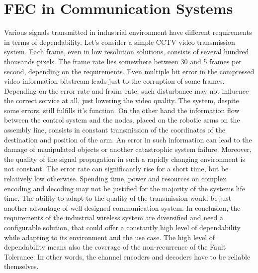\section{FEC in Communication Systems}
Various signals transmitted in industrial environment have different requirements in terms of dependability. Let's consider a simple CCTV video transmission system. Each frame, even in low resolution solutions, consists of several hundred thousands pixels. The frame rate lies somewhere between 30 and 5 frames per second, depending on the requirements. Even multiple bit error in the compressed video information bitstream leads just to the corruption of some frames. Depending on the error rate and frame rate, such disturbance may not influence the correct service at all, just lowering the video quality. The system, despite some errors, still fulfills it's function. 
On the other hand the information flow between the control system and the nodes, placed on the robotic arms on the assembly line, consists in constant transmission of the coordinates of the destination and position of the arm. An error in such information can lead to the damage of manipulated objects or another catastrophic system failure.
Moreover, the quality of the signal propagation in such a rapidly changing environment is not constant. The error rate can significantly rise for a short time, but be relatively low otherwise. Spending time, power and resources on complex encoding and decoding may not be justified for the majority of the systems life time. The ability to adapt to the quality of the transmission would be just another advantage of well designed communication system.
In conclusion, the requirements of the industrial wireless system are diversified and need a configurable solution, that could offer a constantly high level of dependability while adapting to its environment and the use case. The high level of dependability means also the coverage of the non-recurrence of the Fault Tolerance. In other words, the channel encoders and decoders have to be reliable themselves.

